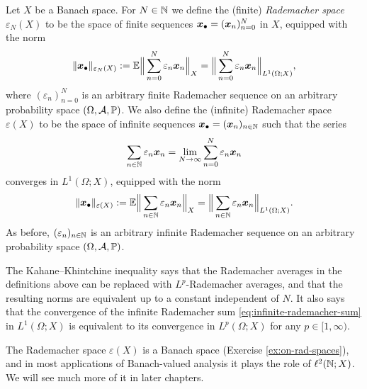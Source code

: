 \begin{defn}
  Let $X$ be a Banach space.
  For $N \in \mathbb{N}$ we define the (finite) \emph{Rademacher space} $\varepsilon_{N}(X)$ to be the space of finite sequences $\bm{x}_{\bullet} = (\bm{x}_{n})_{n=0}^{N}$ in $X$, equipped with the norm
  \begin{equation*}
    \|\bm{x}_{\bullet}\|_{\varepsilon_{N}(X)} := \mathbb{E} \Big\| \sum_{n=0}^{N} \varepsilon_{n} \bm{x}_{n} \Big\|_{X} = \Big\| \sum_{n=0}^{N} \varepsilon_{n} \bm{x}_{n} \Big\|_{L^{1}(\Omega;X)},
  \end{equation*}
  where $(\varepsilon_{n})_{n = 0}^{N}$ is an arbitrary finite Rademacher sequence on an arbitrary probability space $(\Omega,\mathcal{A},\mathbb{P})$.
  We also define the (infinite) Rademacher space $\varepsilon(X)$ to be the space of infinite sequences $\bm{x}_{\bullet} = (\bm{x}_{n})_{n \in \mathbb{N}}$ such that the series
  \begin{equation}\label{eq:infinite-rademacher-sum}
    \sum_{n \in \mathbb{N}} \varepsilon_{n} \bm{x}_{n} = \lim_{N \to \infty} \sum_{n = 0}^{N} \varepsilon_{n} \bm{x}_{n}
  \end{equation}
  converges in $L^{1}(\Omega;X)$, equipped with the norm
  \begin{equation*}
    \|\bm{x}_{\bullet}\|_{\varepsilon(X)} := \mathbb{E} \Big\| \sum_{n \in \mathbb{N}} \varepsilon_{n} \bm{x}_{n} \Big\|_{X} = \Big\| \sum_{n \in \mathbb{N}} \varepsilon_{n} \bm{x}_{n} \Big\|_{L^{1}(\Omega;X)}.
  \end{equation*}
  As before, $(\varepsilon_{n})_{n \in \mathbb{N}}$ is an arbitrary infinite Rademacher sequence on an arbitrary probability space $(\Omega,\mathcal{A},\mathbb{P})$.
\end{defn}

\begin{rmk}
  The Kahane--Khintchine inequality says that the Rademacher averages in the definitions above can be replaced with $L^p$-Rademacher averages, and that the resulting norms are equivalent up to a constant independent of $N$.
  It also says that the convergence of the infinite Rademacher sum \eqref{eq:infinite-rademacher-sum} in $L^1(\Omega;X)$ is equivalent to its convergence in $L^p(\Omega;X)$ for any $p \in [1,\infty)$.
\end{rmk}

The Rademacher space $\varepsilon(X)$ is a Banach space (Exercise \ref{ex:on-rad-spaces}), and in most applications of Banach-valued analysis it plays the role of $\ell^2(\mathbb{N};X)$.
We will see much more of it in later chapters.

